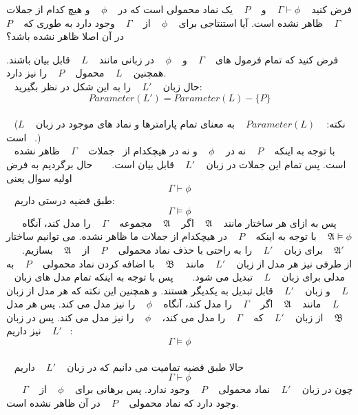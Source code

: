 فرض کنید 
  $\Gamma\vdash\phi$
  و 
  $P$
  یک نماد محمولی است که در
  $\phi$
  و هیچ کدام از جملات 
  $\Gamma$
  ظاهر نشده است. آیا استنتاجی برای 
  $\phi$
  از 
  $\Gamma$
  وجود دارد به طوری که 
  $P$
  در آن اصلا ظاهر نشده باشد؟
\begin{ans}
  فرض کنید که تمام فرمول های 
  $\Gamma$
  و
  $\phi$
  در زبانی مانند 
  $L$
  قابل بیان باشند. همچنین 
  $L$
  محمول
  $P$
  را نیز دارد. 
  \\
  حال زبان 
  $L'$
  را به این شکل در نظر بگیرید: 
  \[Parameter(L') = Parameter(L) - \{P\} \]
  \\
  (نکته: 
  $Parameter(L)$
  به معنای تمام پارامترها و نماد های موجود در زبان 
  $L$
  است.)
  \\
  با توجه به اینکه
  $P$
  نه در 
  $\phi$
  و نه در هیچکدام از  جملات 
  $\Gamma$
  ظاهر نشده است. پس تمام این جملات در زبان 
  $L'$
  قابل بیان است.
  
  حال برگردیم به فرض اولیه سوال یعنی 
  \[\Gamma\vdash\phi\]
  طبق قضیه درستی داریم:
  \[\Gamma\models\phi\]
  پس به ازای هر ساختار مانند 
  $\mathfrak{A}$
  اگر 
  $\mathfrak{A}$
  مجموعه 
  $\Gamma$
  را مدل کند، آنگاه 
  $\mathfrak{A}\models\phi$
  با توجه به اینکه 
  $P$
  در هیچکدام از جملات ما ظاهر نشده. می توانیم ساختار 
  $\mathfrak{A}'$
  برای زبان 
  $L'$
  را به راحتی با حذف نماد محمولی 
  $P$
  از 
  $\mathfrak{A}$
  بسازیم.
  
  از طرفی نیز هر مدل از زبان 
  $L'$
  مانند 
  $\mathfrak{B}$
  با اضافه کردن نماد محمولی 
  $P$
  به مدلی برای زبان 
  $L$
  تبدیل می شود. 
  
  پس با توجه به اینکه تمام مدل های زبان 
  $L$
  و زبان 
  $L'$
  قابل تبدیل به یکدیگر هستند. و همچنین این نکته که هر مدل از زبان 
  $L$
  مانند 
  $\mathfrak{A}$
  اگر 
  $\Gamma$
  را مدل کند، آنگاه 
  $\phi$
  را نیز مدل می کند. پس هر مدل 
  $\mathfrak{B}$
  از زبان 
  $L'$
  که 
  $\Gamma$
  را مدل می کند، 
  $\phi$
  را نیز مدل می کند. پس در زبان 
  $L'$
  نیز داریم: 
  \[\Gamma\models\phi\]
  \\
  حالا طبق قضیه تمامیت می دانیم که در زبان 
  $L'$
  داریم
  \[\Gamma\vdash\phi\]
  چون در زبان 
  $L'$
  نماد محمولی 
  $P$
  وجود ندارد. پس برهانی برای 
  $\phi$
  از 
  $\Gamma$
  وجود دارد که نماد محمولی 
  $P$
  در آن ظاهر نشده است.
\end{ans}
